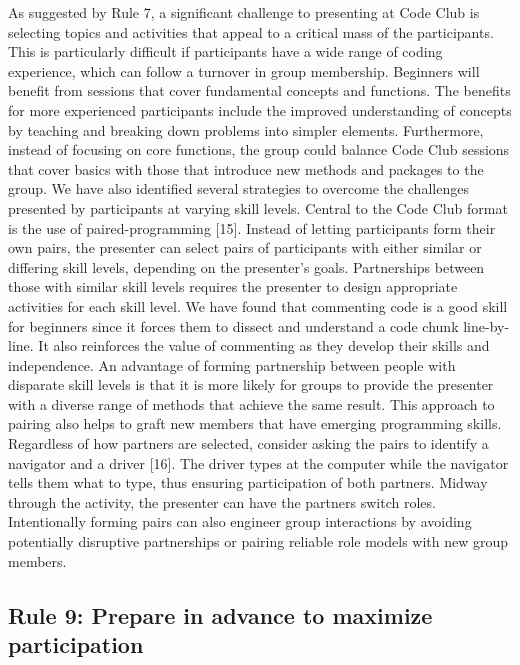 \documentclass[
  11pt,
]{article}
\begin{document}
As suggested by Rule 7, a significant challenge to presenting at Code
Club is selecting topics and activities that appeal to a critical mass
of the participants. This is particularly difficult if participants have
a wide range of coding experience, which can follow a turnover in group
membership. Beginners will benefit from sessions that cover fundamental
concepts and functions. The benefits for more experienced participants
include the improved understanding of concepts by teaching and breaking
down problems into simpler elements. Furthermore, instead of focusing on
core functions, the group could balance Code Club sessions that cover
basics with those that introduce new methods and packages to the group.
We have also identified several strategies to overcome the challenges
presented by participants at varying skill levels. Central to the Code
Club format is the use of paired-programming {[}15{]}. Instead of
letting participants form their own pairs, the presenter can select
pairs of participants with either similar or differing skill levels,
depending on the presenter's goals. Partnerships between those with
similar skill levels requires the presenter to design appropriate
activities for each skill level. We have found that commenting code is a
good skill for beginners since it forces them to dissect and understand
a code chunk line-by-line. It also reinforces the value of commenting as
they develop their skills and independence. An advantage of forming
partnership between people with disparate skill levels is that it is
more likely for groups to provide the presenter with a diverse range of
methods that achieve the same result. This approach to pairing also
helps to graft new members that have emerging programming skills.
Regardless of how partners are selected, consider asking the pairs to
identify a navigator and a driver {[}16{]}. The driver types at the
computer while the navigator tells them what to type, thus ensuring
participation of both partners. Midway through the activity, the
presenter can have the partners switch roles. Intentionally forming
pairs can also engineer group interactions by avoiding potentially
disruptive partnerships or pairing reliable role models with new group
members.

\hypertarget{rule-9-prepare-in-advance-to-maximize-participation}{%
\subsection{Rule 9: Prepare in advance to maximize
participation}\label{rule-9-prepare-in-advance-to-maximize-participation}}
\end{document}
